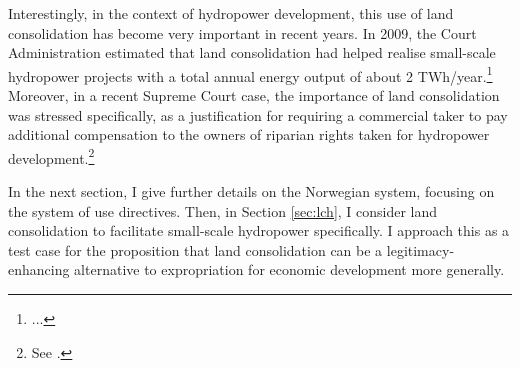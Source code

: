 Interestingly, in the context of hydropower development, this use of land consolidation has become very important in recent years. In 2009, the Court Administration estimated that land consolidation had helped realise small-scale hydropower projects with a total annual energy output of about 2 TWh/year.\footnote{...} Moreover, in a recent Supreme Court case, the importance of land consolidation was stressed specifically, as a justification for requiring a commercial taker to pay additional compensation to the owners of riparian rights taken for hydropower development.\footnote{See \cite{klovtveit11}.}

In the next section, I give further details on the Norwegian system, focusing on the system of use directives. Then, in Section \ref{sec:lch}, I consider land consolidation to facilitate small-scale hydropower specifically. I approach this as a test case for the proposition that land consolidation can be a legitimacy-enhancing alternative to expropriation for economic development more generally.



